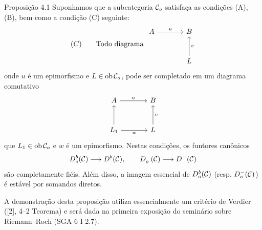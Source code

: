 \begin{statement}{Proposição 4.1}
Suponhamos que a subcategoria $\mathcal C_o$ satisfaça as condições (A), (B), bem como a condição (C) seguinte:
\[
(C)\qquad
\text{Todo diagrama }
\begin{tikzcd}[column sep=large,row sep=large]
A \arrow[r,"u"]&B\\
&L \arrow[u,"v"']
\end{tikzcd}
\]
onde $u$ é um epimorfismo e $L\in\operatorname{ob}\mathcal C_o$, pode ser completado em um diagrama comutativo
\[
\begin{tikzcd}[column sep=large,row sep=large]
A \arrow[r,"u"]&B\\
L_1 \arrow[u] \arrow[r,"w"']&L \arrow[u,"v"']
\end{tikzcd}
\]
que $L_1\in\operatorname{ob}\mathcal C_o$ e $w$ é um epimorfismo. Nestas condições, os funtores canônicos
\[
D_o^b(\mathcal C)\longrightarrow D^b(\mathcal C),\qquad
D_o^-(\mathcal C)\longrightarrow D^-(\mathcal C)
\]
são completamente fiéis. Além disso, a imagem essencial de $D_o^b(\mathcal C)$ (resp. $D_o^-(\mathcal C)$) é estável por somandos diretos.
\end{statement}

A demonstração desta proposição utiliza essencialmente um critério de Verdier ([2], 4--2 Teorema) e será dada na primeira exposição do seminário sobre Riemann--Roch (SGA 6 I 2.7).
